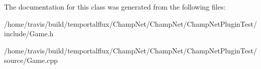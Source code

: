 The documentation for this class was generated from the following files\-:\begin{DoxyCompactItemize}
\item 
/home/travis/build/temportalflux/\-Champ\-Net/\-Champ\-Net/\-Champ\-Net\-Plugin\-Test/include/Game.\-h\item 
/home/travis/build/temportalflux/\-Champ\-Net/\-Champ\-Net/\-Champ\-Net\-Plugin\-Test/source/Game.\-cpp\end{DoxyCompactItemize}
